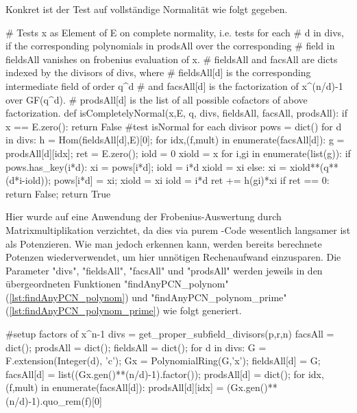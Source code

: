 Konkret ist der Test auf vollständige Normalität wie folgt gegeben.


\begin{sagecode}[caption={[\texttt{isCompletelyNormal} aus 
 \url{../Sage/findAnyPCN_trinom.spyx}]Aus \url{../Sage/findAnyPCN_trinom.spyx}}]
# Tests x as Element of E on complete normality, i.e. tests for each 
# d in divs, if the corresponding polynomials in prodsAll over the corresponding
# field in fieldsAll vanishes on frobenius evaluation of x.
# fieldsAll and facsAll are dicts indexed by the divisors of divs, where
# fieldsAll[d] is the corresponding intermediate field of order q^d
# and facsAll[d] is the factorization of x^(n/d)-1 over GF(q^d).
# prodsAll[d] is the list of all possible cofactors of above factorization.
def isCompletelyNormal(x,E, q, divs, fieldsAll, facsAll, prodsAll):
    if x == E.zero(): return False
    #test isNormal for each divisor
    pows = dict()
    for d in divs:
        h = Hom(fieldsAll[d],E)[0];
        for idx,(f,mult) in enumerate(facsAll[d]):
            g = prodsAll[d][idx];
            ret = E.zero();
            iold = 0
            xiold = x
            for i,gi in enumerate(list(g)):
                if pows.has_key(i*d):
                    xi = pows[i*d];
                    iold = i*d
                    xiold = xi
                else:
                    xi = xiold**(q**(d*i-iold));
                    pows[i*d] = xi;
                    xiold = xi
                    iold = i*d
                ret += h(gi)*xi
            if ret == 0: return False;
    return True
\end{sagecode}

Hier wurde auf eine Anwendung der Frobenius-Auswertung durch
Matrixmultiplikation verzichtet, da dies via purem \sage-Code wesentlich
langsamer ist als Potenzieren. Wie man jedoch erkennen kann, werden bereits
berechnete Potenzen wiederverwendet, um hier unnötigen Rechenaufwand
einzusparen.
Die Parameter "divs", "fieldsAll", "facsAll" und "prodsAll" werden jeweils in
den übergeordneten Funktionen "findAnyPCN_polynom" 
(\autoref{lst:findAnyPCN_polynom}) und
"findAnyPCN_polynom_prime" (\autoref{lst:findAnyPCN_polynom_prime})
wie folgt generiert.

\begin{sagecode}[caption={Aus \url{../Sage/findAnyPCN_trinom.spyx}}]
    #setup factors of x^n-1
    divs = get_proper_subfield_divisors(p,r,n)
    facsAll = dict();
    prodsAll = dict();
    fieldsAll = dict();
    for d in divs:
        G = F.extension(Integer(d), 'c');
        Gx = PolynomialRing(G,'x');
        fieldsAll[d] = G;
        facsAll[d] = list((Gx.gen()**(n/d)-1).factor());
        prodsAll[d] = dict();
        for idx,(f,mult) in enumerate(facsAll[d]):
            prodsAll[d][idx] = (Gx.gen()**(n/d)-1).quo_rem(f)[0]
\end{sagecode}




